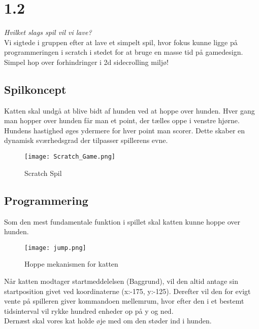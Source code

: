 \section{1.2}

\textit{Hvilket slags spil vil vi lave?}\\

Vi sigtede i gruppen efter at lave et simpelt spil, hvor fokus kunne ligge på programmeringen i scratch i stedet for at bruge en masse tid på gamedesign.\\

Simpel hop over forhindringer i 2d sidecrolling miljø!

\subsection{Spilkoncept}

Katten skal undgå at blive bidt af hunden ved at hoppe over hunden. Hver gang man hopper over hunden får man et point, der tælles oppe i venstre hjørne. Hundens hastighed øges ydermere for hver point man scorer. Dette skaber en dynamisk sværhedsgrad der tilpasser spillerens evne.\\

\begin{figure}[ht]
	\centering
	\texttt{[image: Scratch\_Game.png]}
	\caption{{Scratch Spil}}
	\label{fig:screen_dump}
\end{figure}

\clearpage
\subsection{Programmering}

Som den mest fundamentale funktion i spillet skal katten kunne hoppe over hunden.\\

\begin{figure}[ht]
	\centering
	\texttt{[image: jump.png]}
	\caption{{Hoppe mekanismen for katten}}
	\label{fig:jumpCat}
\end{figure}

Når katten modtager startmeddelelsen (Baggrund), vil den altid antage sin startposition givet ved koordinaterne (x:-175, y:-125). Derefter vil den for evigt vente på spilleren giver kommandoen mellemrum, hvor efter den i et bestemt tidsinterval vil rykke hundred enheder op på y og ned.\\

Dernæst skal vores kat holde øje med om den støder ind i hunden.\\

